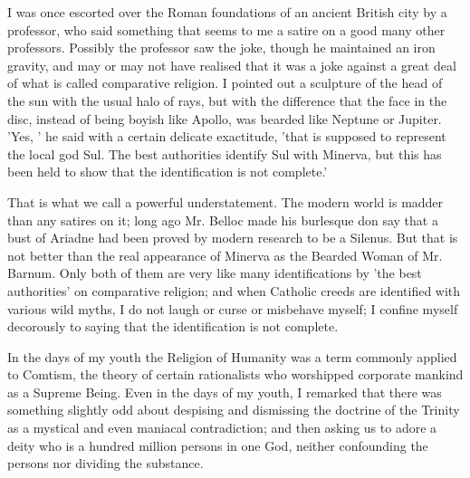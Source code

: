 
I was once escorted over the Roman foundations of an ancient British city by a professor, who said something that seems to me a satire on a good many other professors. Possibly the professor saw the joke, though he maintained an iron gravity, and may or may not have realised that it was a joke against a great deal of what is called comparative religion. I pointed out a sculpture of the head of the sun with the usual halo of rays, but with the difference that the face in the disc, instead of being boyish like Apollo, was bearded like Neptune or Jupiter. 'Yes, ' he said with a certain delicate exactitude, 'that is supposed to represent the local god Sul. The best authorities identify Sul with Minerva, but this has been held to show that the identification is not complete.'

That is what we call a powerful understatement. The modern world is madder than any satires on it; long ago Mr. Belloc made his burlesque don say that a bust of Ariadne had been proved by modern research to be a Silenus. But that is not better than the real appearance of Minerva as the Bearded Woman of Mr. Barnum. Only both of them are very like many identifications by 'the best authorities' on comparative religion; and when Catholic creeds are identified with various wild myths, I do not laugh or curse or misbehave myself; I confine myself decorously to saying that the identification is not complete.

In the days of my youth the Religion of Humanity was a term commonly applied to Comtism, the theory of certain rationalists who worshipped corporate mankind as a Supreme Being. Even in the days of my youth, I remarked that there was something slightly odd about despising and dismissing the doctrine of the Trinity as a mystical and even maniacal contradiction; and then asking us to adore a deity who is a hundred million persons in one God, neither confounding the persons nor dividing the substance.

